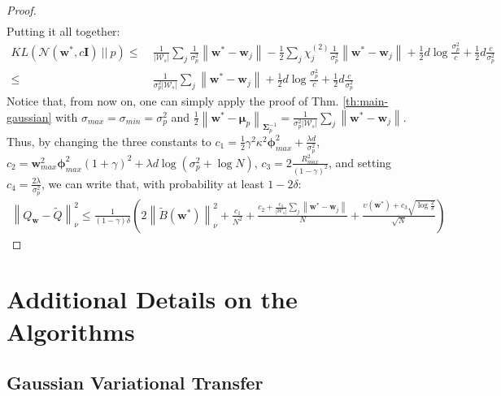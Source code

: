 \documentclass{article}
\newcommand{\wt}[1]{\widetilde{#1}}
\newcommand{\norm}[1]{\left\lVert #1 \right\rVert}
\newcommand{\abs}[1]{\left\lvert #1 \right\rvert}
\begin{document}
\begin{proof}
\begin{align*}
\end{align*}
Putting it all together:
\begin{align*}
KL(\mathcal{N}(\bm{w}^*,c\bm{I})\ ||\ p) \leq\ & \frac{1}{\abs{\mathcal{W}_s}}\sum_{j}\frac{1}{\sigma^2_p}\norm{\bm{w}^* - \bm{w}_{j}} -\frac{1}{2}\sum_j \chi^{(2)}_j \frac{1}{\sigma^2_p}\norm{\bm{w}^* - \bm{w}_j} + \frac{1}{2}d\log\frac{\sigma^2_p}{c}  + \frac{1}{2}d\frac{c}{\sigma^2_p}\\ \leq\ & \frac{1}{\sigma^2_p\abs{\mathcal{W}_s}}\sum_{j}\norm{\bm{w}^* - \bm{w}_{j}} + \frac{1}{2}d\log\frac{\sigma^2_p}{c}  + \frac{1}{2}d\frac{c}{\sigma^2_p}
\end{align*}
Notice that, from now on, one can simply apply the proof of Thm. \ref{th:main-gaussian} with $\sigma_{max}=\sigma_{min}=\sigma^2_p$ and $\frac{1}{2}\norm{\bm{w}^* - \bm{\mu}_p}_{\bm{\Sigma}_p^{-1}} = \frac{1}{\sigma^2_p\abs{\mathcal{W}_s}}\sum_{j}\norm{\bm{w}^* - \bm{w}_{j}}$. Thus, by changing the three constants to $c_1 = \frac{1}{2}\gamma^2\kappa^2\bm{\phi}_{max}^2 + \frac{\lambda d}{\sigma^2_p}$, $c_2 = \bm{w}_{max}^2\bm{\phi}_{max}^2(1 + \gamma)^2 + \lambda d \log(\sigma^2_p + \log N)$, $c_3 = 2\frac{R_{max}^2}{(1-\gamma)^2}$, and setting $c_4 = \frac{2\lambda}{\sigma^2_p}$, we can write that, with probability at least $1-2\delta$:
\begin{align*}
\norm{Q_{\bm{w}} - \wt{Q}}_{\nu}^2 \leq \frac{1}{(1-\gamma)\delta}\left(2\norm{\wt{B}(\bm{w}^{*})}_{\nu}^2 + \frac{c_1}{N^2} + \frac{c_2 + \frac{c_4}{\abs{\mathcal{W}_s}}\sum_{j}\norm{\bm{w}^* - \bm{w}_{j}}}{N} + \frac{\upsilon(\bm{w}^*) + c_3\sqrt{\log\frac{2}{\delta}}}{\sqrt{N}}\right)
\end{align*}
\end{proof}

\section{Additional Details on the Algorithms}

\subsection{Gaussian Variational Transfer}
\end{document}
